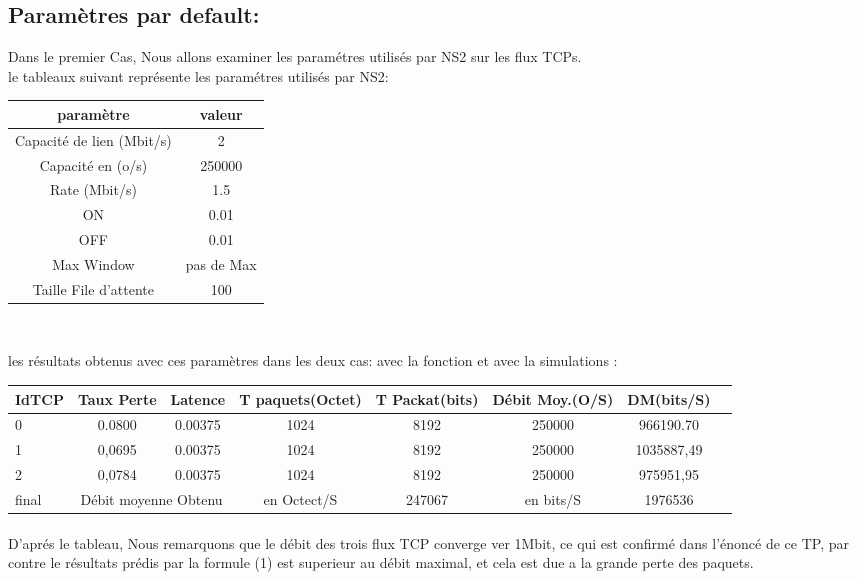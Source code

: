 \documentclass[a4paper]{report}
\theoremstyle{definition}
\begin{document}
\subsection*{Paramètres par default:}
	Dans le premier Cas,  Nous allons examiner les paramétres utilisés par NS2 sur les flux TCPs.\\
	le tableaux suivant représente les paramétres utilisés par NS2: 
\begin{center}
\begin{tabular}{|c|c|}
\hline
 paramètre  & valeur \\ \hline
 
 Capacité de lien (Mbit/s) & 2 \\ 
 Capacité en (o/s)  & 250000 \\ 
 Rate (Mbit/s) & 1.5 \\ 
 ON & 0.01\\ 
 OFF & 0.01 \\ 
 Max Window  & pas de Max\\ 
 Taille File d'attente & 100\\
\hline
\end{tabular}\\
\end{center}

les résultats obtenus avec ces paramètres dans les deux cas: avec la fonction et avec la simulations :\\
\begin{center}

\begin{tabular}{|l|c|c|c|c|c|c|c|}
\hline
 IdTCP & Taux Perte & Latence & T paquets(Octet) & T Packat(bits) & Débit Moy.(O/S) & DM(bits/S) \\ \hline
 0 & 0.0800 & 0.00375 & 1024 & 8192 & 250000 & 966190.70\\
 1 & 0,0695 & 0.00375 & 1024 & 8192 & 250000 & 1035887,49\\ 
 2 & 0,0784 & 0.00375 & 1024 & 8192 & 250000 & 975951,95\\ \hline
 final & \multicolumn{2}{c|}{Débit moyenne Obtenu} & en Octect/S & 247067 & en bits/S & 1976536 \\ 
\hline
\end{tabular}
\end{center}
\paragraph*{} D'aprés le tableau, Nous remarquons que le débit des trois flux TCP converge ver 1Mbit, ce qui est confirmé dans l'énoncé de ce TP, par contre le résultats prédis par la formule (1) est superieur au débit maximal, et cela est due a la grande perte des paquets. 
\end{document}

